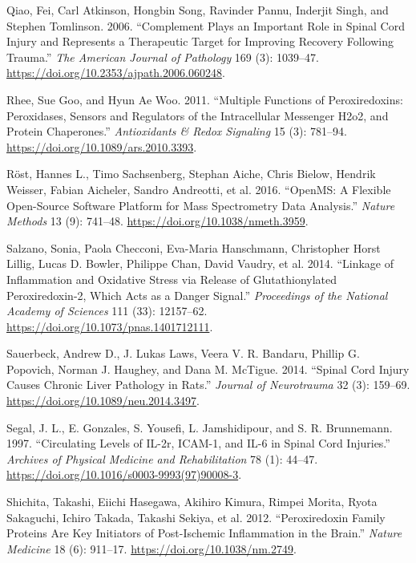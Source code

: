 \documentclass[9pt,lineno]{elife}
\newlength{\cslhangindent}
\newlength{\cslentryspacingunit} %
\newenvironment{CSLReferences}[2] %
 {%
  \setlength{\parindent}{0pt}
  \ifodd #1
  \let\oldpar\par
  \def\par{\hangindent=\cslhangindent\oldpar}
  \fi
  \setlength{\parskip}{#2\cslentryspacingunit}
 }%
 {}
\begin{document}
\begin{landscape}
\begin{landscape}
\begin{CSLReferences}{1}{0}
\leavevmode{}%
Qiao, Fei, Carl Atkinson, Hongbin Song, Ravinder Pannu, Inderjit Singh, and Stephen Tomlinson. 2006. {``Complement {Plays} an {Important Role} in {Spinal Cord Injury} and {Represents} a {Therapeutic Target} for {Improving Recovery} Following {Trauma}.''} \emph{The American Journal of Pathology} 169 (3): 1039--47. \url{https://doi.org/10.2353/ajpath.2006.060248}.

\leavevmode{}%
Rhee, Sue Goo, and Hyun Ae Woo. 2011. {``Multiple {Functions} of {Peroxiredoxins}: {Peroxidases}, {Sensors} and {Regulators} of the {Intracellular Messenger H2o2}, and {Protein Chaperones}.''} \emph{Antioxidants \& Redox Signaling} 15 (3): 781--94. \url{https://doi.org/10.1089/ars.2010.3393}.

\leavevmode{}%
Röst, Hannes L., Timo Sachsenberg, Stephan Aiche, Chris Bielow, Hendrik Weisser, Fabian Aicheler, Sandro Andreotti, et al. 2016. {``{OpenMS}: A Flexible Open-Source Software Platform for Mass Spectrometry Data Analysis.''} \emph{Nature Methods} 13 (9): 741--48. \url{https://doi.org/10.1038/nmeth.3959}.

\leavevmode{}%
Salzano, Sonia, Paola Checconi, Eva-Maria Hanschmann, Christopher Horst Lillig, Lucas D. Bowler, Philippe Chan, David Vaudry, et al. 2014. {``Linkage of Inflammation and Oxidative Stress via Release of Glutathionylated Peroxiredoxin-2, Which Acts as a Danger Signal.''} \emph{Proceedings of the National Academy of Sciences} 111 (33): 12157--62. \url{https://doi.org/10.1073/pnas.1401712111}.

\leavevmode{}%
Sauerbeck, Andrew D., J. Lukas Laws, Veera V. R. Bandaru, Phillip G. Popovich, Norman J. Haughey, and Dana M. McTigue. 2014. {``Spinal {Cord Injury Causes Chronic Liver Pathology} in {Rats}.''} \emph{Journal of Neurotrauma} 32 (3): 159--69. \url{https://doi.org/10.1089/neu.2014.3497}.

\leavevmode{}%
Segal, J. L., E. Gonzales, S. Yousefi, L. Jamshidipour, and S. R. Brunnemann. 1997. {``Circulating Levels of {IL-2r}, {ICAM-1}, and {IL-6} in Spinal Cord Injuries.''} \emph{Archives of Physical Medicine and Rehabilitation} 78 (1): 44--47. \url{https://doi.org/10.1016/s0003-9993(97)90008-3}.

\leavevmode{}%
Shichita, Takashi, Eiichi Hasegawa, Akihiro Kimura, Rimpei Morita, Ryota Sakaguchi, Ichiro Takada, Takashi Sekiya, et al. 2012. {``Peroxiredoxin Family Proteins Are Key Initiators of Post-Ischemic Inflammation in the Brain.''} \emph{Nature Medicine} 18 (6): 911--17. \url{https://doi.org/10.1038/nm.2749}.


\end{CSLReferences}
\end{landscape}
\end{landscape}
\end{document}
